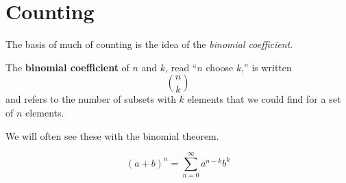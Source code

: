 \chapter{Counting}

The basis of much of counting is the idea of the \emph{binomial coefficient}.
\begin{defn}
  The \textbf{binomial coefficient} of $n$ and $k$, read ``$n$ choose $k$,'' is written
  \[ n \choose k \]
  and refers to the number of subsets with $k$ elements that we could find for a set of $n$ elements.
\end{defn}

We will often see these with the binomial theorem.
\begin{theorem}
  \begin{equation}
    (a+b)^n = \sum^\infty_{n=0} a^{n-k}b^k
  \end{equation}
\end{theorem}

